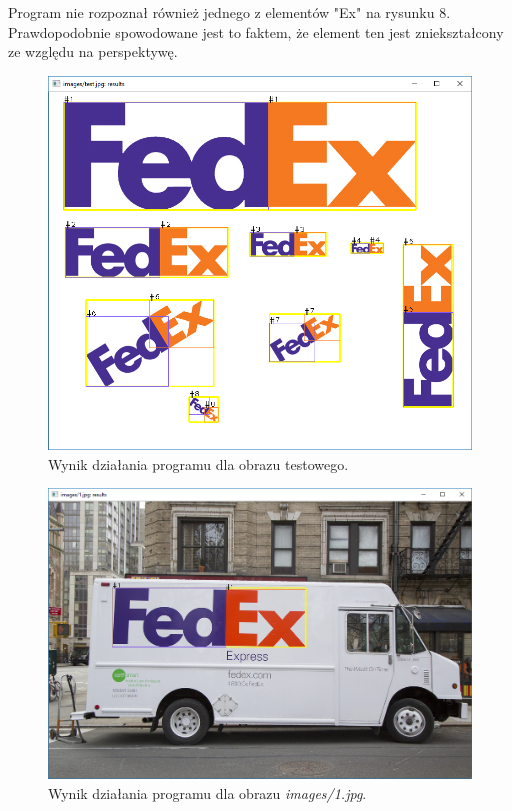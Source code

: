 \documentclass[12pt, oneside, final]{report}
\begin{document}
Program nie rozpoznał również jednego z elementów "Ex" na rysunku 8. Prawdopodobnie spowodowane jest to faktem, że element ten jest zniekształcony ze względu na perspektywę.
\begin{figure}[ht!]
	\centering
	\includegraphics[height=0.4\textheight]{images/result0.png}
	\caption{Wynik działania programu dla obrazu testowego.}
\end{figure}
\begin{figure}[ht!]
	\centering
	\includegraphics[height=0.4\textheight]{images/result1.png}
	\caption{Wynik działania programu dla obrazu \textit{images/1.jpg}.}
\end{figure}
\end{document}
